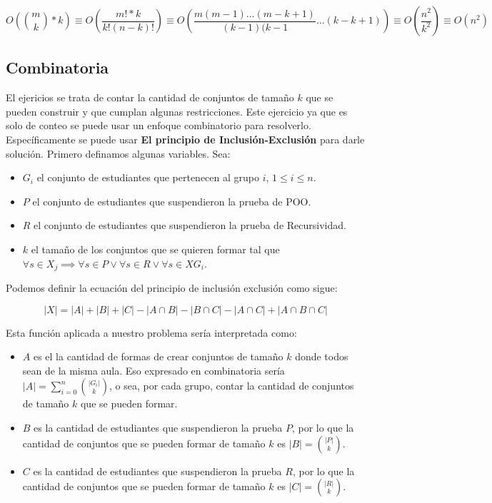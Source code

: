 \documentclass{article}
\begin{document}
    $$  O({m \choose k} * k) \equiv O(\frac{m! * k}{k!(n - k)!}) \equiv O(\frac{m(m - 1) \dotsc (m - k + 1)}{(k - 1)(k - 1} \dotsc (k - k + 1)) \equiv O(\frac{n^2}{k^2}) \equiv O(n^2)$$

\subsection{Combinatoria}

El ejericios se trata de contar la cantidad de conjuntos de tamaño $k$ que se pueden construir y que cumplan algunas restricciones. Este ejercicio ya que es solo de conteo se puede usar un enfoque combinatorio para resolverlo. Específicamente se puede usar \textbf{El principio de Inclusión-Exclusión} para darle solución. Primero definamos algunas variables. Sea:

\begin{itemize}
    \item $G_i$ el conjunto de estudiantes que pertenecen al grupo $i$, $1 \leq i \leq n$.
    \item $P$ el conjunto de estudiantes que suspendieron la prueba de POO.
    \item $R$ el conjunto de estudiantes que suspendieron la prueba de Recursividad.
    \item $k$ el tamaño de los conjuntos que se quieren formar tal que $\forall s \in X_j \implies \forall s \in P \lor \forall s \in R \lor \forall s \in XG_i$.
\end{itemize}

Podemos definir la ecuación del principio de inclusión exclusión como sigue:

$$
   |X| = |A| + |B| + |C| - |A \cap B| - |B \cap C| - |A \cap C| + |A \cap B \cap C| 
$$

Esta función aplicada a nuestro problema sería interpretada como:

\begin{itemize}
    \item $A$ es el la cantidad de formas de crear conjuntos de tamaño $k$ donde todos sean de la misma aula. Eso expresado en combinatoria sería $|A| = \sum_{i=0}^{n} {|G_i| \choose k}$, o sea, por cada grupo, contar la cantidad de conjuntos de tamaño $k$ que se pueden formar.
    \item $B$ es la cantidad de estudiantes que suspendieron la prueba $P$, por lo que la cantidad de conjuntos que se pueden formar de tamaño $k$ es $|B| = {|P| \choose k}$.
    \item $C$ es la cantidad de estudiantes que suspendieron la prueba $R$, por lo que la cantidad de conjuntos que se pueden formar de tamaño $k$ es $|C| = {|R| \choose k}$.
\end{itemize}
\end{document}
